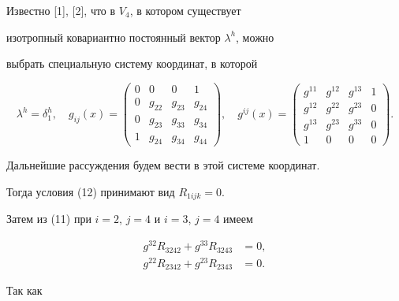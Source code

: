 Известно [1], [2], что в $V_4$, в котором существует


изотропный ковариантно постоянный вектор $\lambda ^h$, можно


выбрать специальную систему координат, в которой


$$


\lambda ^h=\delta_1^h,


\quad


g_{ij}(x)=


\begin{pmatrix}


0 & 0 & 0 & 1 \\


0 & g_{22} & g_{23} & g_{24} \\


0 & g_{23} & g_{33} & g_{34} \\


1 & g_{24} & g_{34} & g_{44}


\end{pmatrix}


, \quad


g^{ij}(x)=


\begin{pmatrix}


g^{11} & g^{12} & g^{13} & 1 \\


g^{12} & g^{22} & g^{23} & 0 \\


g^{13} & g^{23} & g^{33} & 0 \\


1 & 0 & 0 & 0


\end{pmatrix}. 


$$ 


 


Дальнейшие рассуждения будем вести в этой системе координат.


Тогда условия (12) принимают вид $R_{1ijk}=0$.


Затем из (11) при $i=2$, $j=4$ и $i=3$, $j=4$ имеем


\begin{align*}


g^{32}R_{3242}+g^{33}R_{3243}&=0,\\


g^{22}R_{2342}+g^{23}R_{2343}&=0.


\end{align*}


Так как


